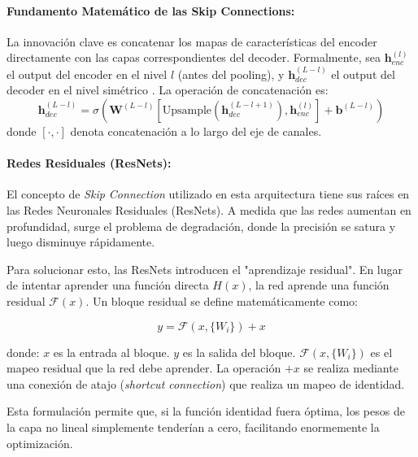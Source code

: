 \documentclass{article}
\begin{document}
\paragraph{Fundamento Matemático de las Skip Connections:} La innovación clave es concatenar los mapas de características del encoder directamente con las capas correspondientes del decoder. Formalmente, sea $\mathbf{h}_{enc}^{(l)}$ el output del encoder en el nivel $l$ (antes del pooling), y $\mathbf{h}_{dec}^{(L-l)}$ el output del decoder en el nivel simétrico \cite{14}. La operación de concatenación es:
\begin{equation}
\mathbf{h}_{dec}^{(L-l)} = \sigma\left(\mathbf{W}^{(L-l)} \left[\text{Upsample}(\mathbf{h}_{dec}^{(L-l+1)}), \mathbf{h}_{enc}^{(l)}\right] + \mathbf{b}^{(L-l)}\right)
\end{equation}
donde $[\cdot, \cdot]$ denota concatenación a lo largo del eje de canales.

\paragraph{Redes Residuales (ResNets):}
El concepto de \textit{Skip Connection} utilizado en esta arquitectura tiene sus raíces en las Redes Neuronales Residuales (ResNets). A medida que las redes aumentan en profundidad, surge el problema de degradación, donde la precisión se satura y luego disminuye rápidamente.

Para solucionar esto, las ResNets introducen el "aprendizaje residual". En lugar de intentar aprender una función directa $H(x)$, la red aprende una función residual $\mathcal{F}(x)$. Un bloque residual se define matemáticamente como:

\begin{equation}
    y = \mathcal{F}(x, \{W_i\}) + x
\end{equation}

donde: $x$ es la entrada al bloque.
     $y$ es la salida del bloque.
     $\mathcal{F}(x, \{W_i\})$ es el mapeo residual que la red debe aprender.
     La operación $+ x$ se realiza mediante una conexión de atajo (\textit{shortcut connection}) que realiza un mapeo de identidad.

Esta formulación permite que, si la función identidad fuera óptima, los pesos de la capa no lineal simplemente tenderían a cero, facilitando enormemente la optimización.
\end{document}
